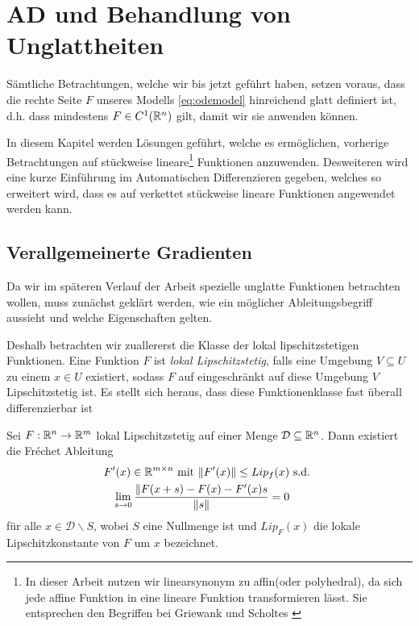 \chapter{AD und Behandlung von Unglattheiten}
 Sämtliche Betrachtungen, welche wir bis jetzt geführt haben, setzen voraus, dass die rechte Seite $F$ unseres Modells \eqref{eq:odemodel} hinreichend glatt definiert ist, d.h. dass mindestens $F\in C^1(\mathbb{R}^n)$ gilt, damit wir sie anwenden können. 

In diesem Kapitel werden Lösungen geführt, welche es ermöglichen, vorherige Betrachtungen auf stückweise lineare\footnote{In dieser Arbeit nutzen wir \glqq linear\grqq  synonym zu \glqq affin\grqq (oder \glqq polyhedral\grqq), da sich jede affine Funktion in eine lineare Funktion  transformieren lässt. Sie entsprechen den Begriffen bei Griewank \cite{monster} und Scholtes \cite{scholtes2012introduction}}
Funktionen
anzuwenden. Desweiteren wird eine kurze Einführung im Automatischen Differenzieren gegeben, welches so erweitert wird, dass es auf verkettet stückweise lineare Funktionen angewendet werden kann.
\section{Verallgemeinerte Gradienten}
Da wir im späteren Verlauf der Arbeit spezielle unglatte Funktionen betrachten wollen, muss zunächst geklärt werden, wie ein möglicher Ableitungsbegriff aussieht und welche Eigenschaften gelten.

Deshalb betrachten wir zuallererst die Klasse der lokal lipschitzstetigen Funktionen. Eine Funktion $F$ ist \textit{lokal Lipschitzstetig}, falls eine Umgebung $V\subseteq U$ zu einem $x\in U$ existiert, sodass $F$ auf eingeschränkt auf diese Umgebung $V$ Lipschitzstetig ist.
Es stellt sich heraus, dass diese Funktionenklasse fast überall differenzierbar ist \cite[S.216 ff]{federer1969geometric}
\begin{theorem}[Rademacher]
\label{thm:rademacher}
 Sei $F:\mathbb{R}^n\to \mathbb{R}^m$ lokal Lipschitzstetig auf einer Menge $\mathcal D\subseteq \mathbb{R}^n$. Dann existiert die Fréchet Ableitung 
 \[
 \begin{aligned}
  F'(x)\in \mathbb{R}^{m\times n} \text{ mit } \|F'(x)\|  \leq Lip_f(x) & \text{ s.d. }\\
   \lim_{s\to 0}\frac{\|F(x+s)-F(x)-F'(x)s}{\|s\|} = 0&
  \end{aligned}
 \]
für alle $x\in \mathcal D\backslash S$, wobei $S$ eine Nullmenge ist und $Lip_F(x)$ die lokale Lipschitzkonstante von $F$ um $x$ bezeichnet.
\end{theorem}

